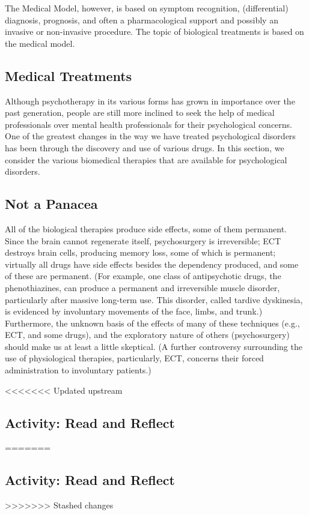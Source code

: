 \documentclass[
]{book}
\begin{document}
The Medical Model, however, is based on symptom recognition, (differential) diagnosis, prognosis, and often a pharmacological support and possibly an invasive or non-invasive procedure. The topic of biological treatments is based on the medical model.

\hypertarget{medical-treatments-1}{%
\subsection*{Medical Treatments}\label{medical-treatments-1}}

Although psychotherapy in its various forms has grown in importance over the past generation, people are still more inclined to seek the help of medical professionals over mental health professionals for their psychological concerns. One of the greatest changes in the way we have treated psychological disorders has been through the discovery and use of various drugs. In this section, we consider the various biomedical therapies that are available for psychological disorders.

\hypertarget{not-a-panacea-1}{%
\subsection*{Not a Panacea}\label{not-a-panacea-1}}

All of the biological therapies produce side effects, some of them permanent. Since the brain cannot regenerate itself, psychosurgery is irreversible; ECT destroys brain cells, producing memory loss, some of which is permanent; virtually all drugs have side effects besides the dependency produced, and some of these are permanent. (For example, one class of antipsychotic drugs, the phenothiazines, can produce a permanent and irreversible muscle disorder, particularly after massive long-term use. This disorder, called tardive dyskinesia, is evidenced by involuntary movements of the face, limbs, and trunk.) Furthermore, the unknown basis of the effects of many of these techniques (e.g., ECT, and some drugs), and the exploratory nature of others (psychosurgery) should make us at least a little skeptical. (A further controversy surrounding the use of physiological therapies, particularly, ECT, concerns their forced administration to involuntary patients.)

<<<<<<< Updated upstream
\hypertarget{activity-read-and-reflect-24}{%
\subsection*{Activity: Read and Reflect}\label{activity-read-and-reflect-24}}
=======
\hypertarget{activity-read-and-reflect-23}{%
\subsection*{Activity: Read and Reflect}\label{activity-read-and-reflect-23}}
>>>>>>> Stashed changes
\end{document}
